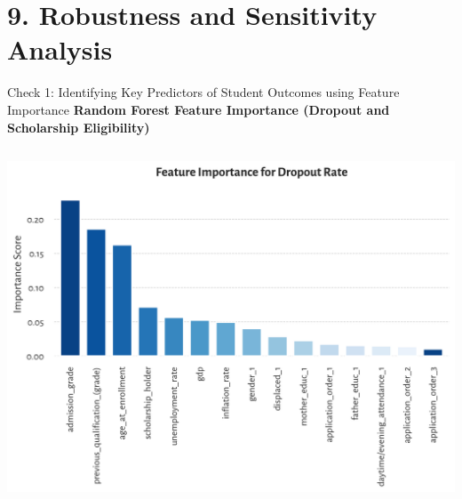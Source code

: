 \documentclass[aspectratio=169]{beamer}
\begin{document}
\section{9. Robustness and Sensitivity Analysis}


\begin{frame}{Check 1: Identifying Key Predictors of Student Outcomes using Feature Importance}
\centering
\textbf{Random Forest Feature Importance (Dropout and Scholarship Eligibility)}

\vspace{5pt}

\begin{columns}
\begin{column}{0.5\textwidth}
\centering
\includegraphics[width=\linewidth]{Tex_Pictures/feature_dropout}


\end{column}
\end{columns}
\end{frame}
\end{document}
